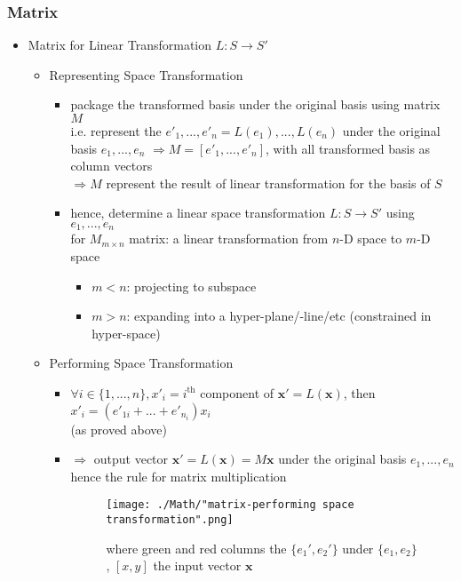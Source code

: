 \subsubsection{Matrix}
\begin{itemize}
\item Matrix for Linear Transformation $L : S\rightarrow S'$
	\begin{itemize}
	\item Representing Space Transformation
		\begin{itemize}
		\item package the transformed basis under the original basis using matrix $M$ \\
		i.e. represent the $e'_1,...,e'_n = L(e_1),...,L(e_n)$ under the original basis $e_1,...,e_n$
		$\Rightarrow M = [e'_1, ..., e'_n]$, with all transformed basis as column vectors \\
		$\Rightarrow M$ represent the result of linear transformation for the basis of $S$
		\item hence, determine a linear space transformation $L:S\rightarrow S'$ using $e_1,...,e_n$ \\
		for $M_{m\times n}$ matrix: a linear transformation from $n$-D space to $m$-D space
			\begin{itemize}
			\item $m<n$: projecting to subspace
			\item $m>n$: expanding into a hyper-plane/-line/etc (constrained in hyper-space)
			\end{itemize}
		 
		\end{itemize}
	\item Performing Space Transformation
		\begin{itemize}
		\item $\displaystyle \forall i\in \{1,...,n\}, x'_i = i^\text{th}$ component of $\mathbf x'=L(\mathbf x)$, then $x'_i = (e'_{1i}+...+e'_{n_i})x_i$ \\
		(as proved above)
		\item $\Rightarrow$ output vector $\mathbf x' = L(\mathbf x)=M\mathbf x$ under the original basis $e_1,...,e_n$ \\
		hence the rule for matrix multiplication
		\begin{figure}[ht]
		\texttt{[image: ./Math/"matrix-performing space transformation".png]}
		\caption*{where green and red columns the $\{e_1',e_2'\}$ under $\{e_1,e_2\}$, $[x,y]$ the input vector $\mathbf x$}
		\end{figure}
		\end{itemize}
	\end{itemize}


\end{itemize}
